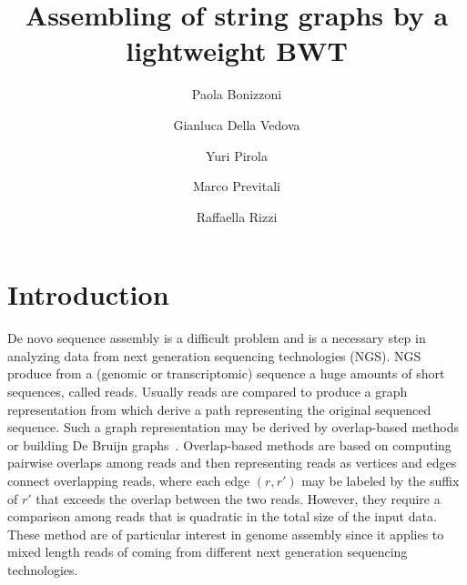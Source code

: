 \documentclass[runningheads,envcountsame,a4paper]{llncs}
\newcommand{\etal}{\textit{et al.}\xspace}
\begin{document}
\title{Assembling of  string graphs by a lightweight BWT}

\author{%
  Paola Bonizzoni \and
  Gianluca Della Vedova \and
  Yuri Pirola \and
  Marco Previtali \and
  Raffaella Rizzi
}
\authorrunning{Bonizzoni \etal}


\maketitle

\begin{abstract}


\end{abstract}

\section{Introduction}
De novo sequence assembly is a difficult problem and is a necessary step
in analyzing data from next generation sequencing technologies (NGS).
NGS produce from a (genomic or transcriptomic) sequence a huge amounts
of short sequences, called reads.
Usually reads are compared to produce a graph representation from which
derive a path representing the original sequenced sequence.
Such a graph representation may be derived by overlap-based methods or
building De Bruijn graphs~\cite{Zerbino2008, Simpson2009, Peng2010}.
Overlap-based methods are based on computing pairwise overlaps among
reads and then representing reads as vertices and edges connect
overlapping reads, where each edge $(r,r')$ may be labeled by the suffix
of $r'$ that exceeds the overlap between the two reads.
However, they require a comparison among reads that is quadratic in the
total size of the input data.
These method are of particular interest in genome assembly since it
applies to mixed length reads of coming from different next generation
sequencing technologies.
\end{document}
